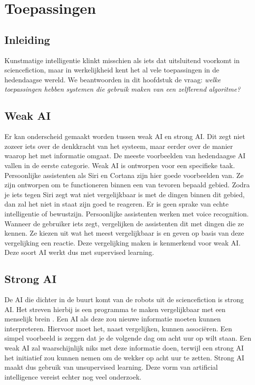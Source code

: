 \section{Toepassingen}

\subsection{Inleiding}
Kunstmatige intelligentie klinkt misschien als iets dat uitsluitend voorkomt in sciencefiction, maar in werkelijkheid kent het al vele toepassingen in de hedendaagse wereld. We beantwoorden in dit hoofdstuk de vraag: \textit{welke toepassingen hebben systemen die gebruik maken van een zelflerend algoritme?}

\subsection{Weak AI}
Er kan onderscheid gemaakt worden tussen weak AI en strong AI. Dit zegt niet zozeer iets over de denkkracht van het systeem, maar eerder over de manier waarop het met informatie omgaat.
De meeste voorbeelden van hedendaagse AI vallen in de eerste categorie. Weak AI is ontworpen voor een specifieke taak. Persoonlijke assistenten als Siri en Cortana zijn hier goede voorbeelden van. Ze zijn ontworpen om te functioneren binnen een van tevoren bepaald gebied. Zodra je iets tegen Siri zegt wat niet vergelijkbaar is met de dingen binnen dit gebied, dan zal het niet in staat zijn goed te reageren. Er is geen sprake van echte intelligentie of bewustzijn.
Persoonlijke assistenten werken met voice recognition. Wanneer de gebruiker iets zegt, vergelijken de assistenten dit met dingen die ze kennen. Ze kiezen uit wat het meest vergelijkbaar is en geven op basis van deze vergelijking een reactie. Deze vergelijking maken is kenmerkend voor weak AI. Deze soort AI werkt dus met supervised learning.

\subsection{Strong AI}
De AI die dichter in de buurt komt van de robots uit de sciencefiction is strong AI. Het streven hierbij is een programma te maken vergelijkbaar met een menselijk brein \cite{Searle}. Een AI als deze zou nieuwe informatie moeten kunnen interpreteren. Hiervoor moet het, naast vergelijken, kunnen associ\"{e}ren. Een simpel voorbeeld is zeggen dat je de volgende dag om acht uur op wilt staan. Een weak AI zal waarschijnlijk niks met deze informatie doen, terwijl een strong AI het initiatief zou kunnen nemen om de wekker op acht uur te zetten. Strong AI maakt dus gebruik van unsupervised learning.
Deze vorm van artificial intelligence vereist echter nog veel onderzoek.

